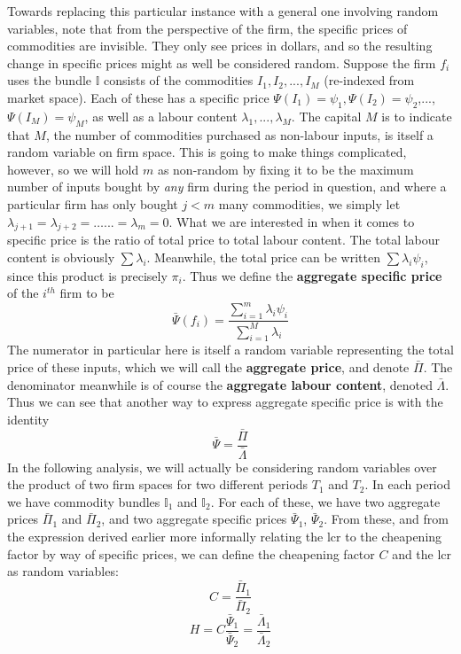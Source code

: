 Towards replacing this particular instance with a general one involving random variables, note that from the perspective of the firm, the specific prices of commodities are invisible. They only see prices in dollars, and so the resulting change in specific prices might as well be considered random. Suppose the firm $f_i$ uses the bundle $\mathbb{I}$ consists of the commodities $I_1,I_2,...,I_M$ (re-indexed from market space). Each of these has a specific price $\Psi(I_1) = \psi_1, \Psi(I_2) = \psi_2$,...,$\Psi(I_M) = \psi_M$, as well as a labour content $\lambda_1,...,\lambda_M$. The capital $M$ is to indicate that $M$, the number of commodities purchased as non-labour inputs, is itself a random variable on firm space. This is going to make things complicated, however, so we will hold $m$ as non-random by fixing it to be the maximum number of inputs bought by \textit{any} firm during the period in question, and where a particular firm has only bought $j < m$ many commodities, we simply let $\lambda_{j+1}= \lambda_{j+2} = \ldots... = \lambda_m = 0$.  What we are interested in when it comes to specific price is the ratio of total price to total labour content. The total labour content is obviously $\sum \lambda_i$. Meanwhile, the total price can be written $\sum \lambda_i \psi_i$, since this product is precisely $\pi_i$. Thus we define the \textbf{aggregate specific price} of the $i^{th}$ firm to be
 \[ \bar{\Psi}(f_i) = \frac{\sum_{i=1}^m \lambda_i \psi_i}{\sum_{i=1}^M \lambda_i} \]
The numerator in particular here is itself a random variable representing the total price of these inputs, which we will call the \textbf{aggregate price}, and denote $\bar{\Pi}$. The denominator meanwhile is of course the \textbf{aggregate labour content}, denoted $\bar{\Lambda}$. Thus we can see that another way to express aggregate specific price is with the identity 
\[\bar{\Psi} = \frac{\bar{\Pi}}{\bar{\Lambda}} \]
In the following analysis, we will actually be considering random variables over the product of two firm spaces for two different periods $T_1$ and $T_2$. In each period we have commodity bundles $\mathbb{I}_1$ and $\mathbb{I}_2$. For each of these, we have two aggregate prices $\bar{\Pi}_1$ and $\bar{\Pi}_2$, and two aggregate specific prices $\bar{\Psi}_1$, $\bar{\Psi}_2$. From these, and from the expression derived earlier more informally relating the lcr to the cheapening factor by way of specific prices, we can define the cheapening factor $C$ and the lcr as random variables:
\[ C = \frac{\bar{\Pi}_1}{\bar{\Pi}_2} \]
\[ H = C \frac{\bar{\Psi}_1}{\bar{\Psi}_2} = \frac{\bar{\Lambda}_1}{\bar{\Lambda}_2} \]
